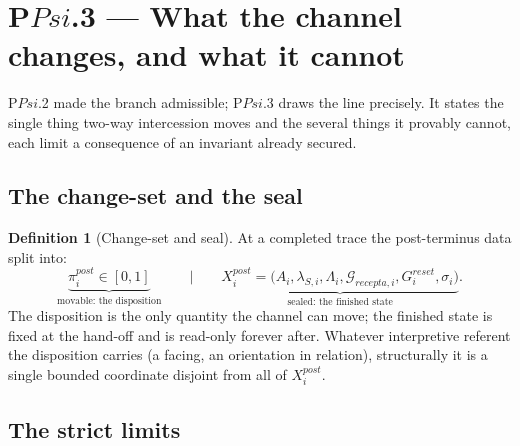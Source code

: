 \documentclass[11pt,a4paper]{article}
\def\Psi{Psi}%
\def\mathrm#1{#1}%
\theoremstyle{definition}
\newtheorem{definition}{Definition}[section]
\theoremstyle{plain}
\theoremstyle{remark}
\begin{document}
\section{P$\Psi$.3 --- What the channel changes, and what it cannot}

P$\Psi$.2 made the branch admissible; P$\Psi$.3 draws the line precisely. It states the single
thing two-way intercession moves and the several things it provably cannot, each limit a
consequence of an invariant already secured.

\subsection{The change-set and the seal}

\begin{definition}[Change-set and seal]\label{def:changeset}
At a completed trace the post-terminus data split into:
\[
\boxed{\;
\underbrace{\pi_i^{\mathrm{post}}\in[0,1]}_{\text{movable: the disposition}}
\qquad\Big|\qquad
\underbrace{X_i^{\mathrm{post}}=\bigl(A_i,\lambda_{S,i},\Lambda_i,\mathcal G_{\mathrm{recepta},i},G_i^{\mathrm{reset}},\sigma_i\bigr)}_{\text{sealed: the finished state}} .
\;}
\]
The disposition is the only quantity the channel can move; the finished state is fixed at the
hand-off and is read-only forever after. Whatever interpretive referent the disposition carries
(a facing, an orientation in relation), structurally it is a single bounded coordinate disjoint
from all of \(X_i^{\mathrm{post}}\).
\end{definition}

\subsection{The strict limits}
\end{document}
